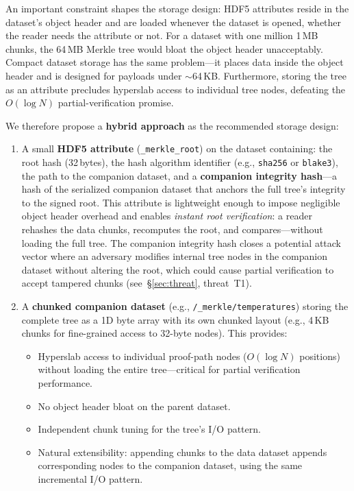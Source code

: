 \documentclass[11pt]{article}
\begin{document}
\noindent An important constraint shapes the storage design: HDF5 attributes
reside in the dataset's object header and are loaded whenever the dataset is
opened, whether the reader needs the attribute or not. For a dataset with one
million 1\,MB chunks, the 64\,MB Merkle tree would bloat the object header
unacceptably. Compact dataset storage has the same problem---it places data
inside the object header and is designed for payloads under $\sim$64\,KB.
Furthermore, storing the tree as an attribute precludes hyperslab access to
individual tree nodes, defeating the $O(\log N)$ partial-verification promise.

We therefore propose a \textbf{hybrid approach} as the recommended storage
design:

\begin{enumerate}[nosep]
  \item A small \textbf{HDF5 attribute} (\texttt{\_merkle\_root}) on the
    dataset containing: the root hash (32\,bytes), the hash algorithm
    identifier (e.g., \texttt{sha256} or \texttt{blake3}), the path to the
    companion dataset, and a \textbf{companion integrity hash}---a hash of
    the serialized companion dataset that anchors the full tree's integrity
    to the signed root. This attribute is lightweight enough to impose
    negligible object header overhead and enables \emph{instant root
    verification}: a reader rehashes the data chunks, recomputes the root, and
    compares---without loading the full tree. The companion integrity hash
    closes a potential attack vector where an adversary modifies internal tree
    nodes in the companion dataset without altering the root, which could
    cause partial verification to accept tampered chunks
    (see~\S\ref{sec:threat}, threat~T1).
  \item A \textbf{chunked companion dataset} (e.g.,
    \texttt{/\_merkle/temperatures}) storing the complete tree as a 1D byte
    array with its own chunked layout (e.g., 4\,KB chunks for fine-grained
    access to 32-byte nodes). This provides:
    \begin{itemize}[nosep]
      \item Hyperslab access to individual proof-path nodes ($O(\log N)$
        positions) without loading the entire tree---critical for partial
        verification performance.
      \item No object header bloat on the parent dataset.
      \item Independent chunk tuning for the tree's I/O pattern.
      \item Natural extensibility: appending chunks to the data dataset appends
        corresponding nodes to the companion dataset, using the same
        incremental I/O pattern.
    \end{itemize}
\end{enumerate}
\end{document}
